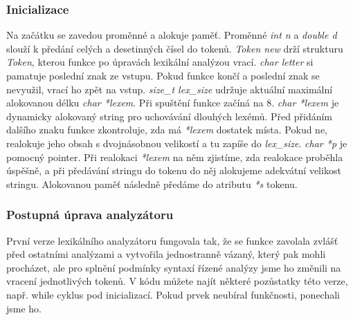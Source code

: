 \documentclass[a4paper, 12pt]{article}
\begin{document}
\subsubsection{Inicializace}
Na začátku se zavedou proměnné a alokuje paměť.\newline
Proměnné \textit{int n} a \textit{double d} slouží k předání celých a desetinných čísel do tokenů. \textit{Token new} drží strukturu \textit{Token}, kterou funkce po úpravách lexikální analýzou vrací. \textit{char letter} si pamatuje poslední znak ze vstupu. Pokud funkce končí a poslední znak se nevyužil, vrací ho zpět na vstup. \textit{size\_t lex\_size} udržuje aktuální maximální alokovanou délku \textit{char *lexem}. Při spuštění funkce začíná na 8. \textit{char *lexem} je dynamicky alokovaný string pro uchovávání dlouhých lexémů. Před přidáním dalšího znaku funkce zkontroluje, zda má \textit{*lexem} dostatek místa. Pokud ne, realokuje jeho obsah s dvojnásobnou velikostí a tu zapíše do \textit{lex\_size}. \textit{char *p} je pomocný pointer. Při realokaci \textit{*lexem} na něm zjistíme, zda realokace proběhla úspěšně, a při předávání stringu do tokenu do něj alokujeme adekvátní velikost stringu. Alokovanou paměť následně předáme do atributu \textit{*s} tokenu.

\subsubsection{Postupná úprava analyzátoru}
První verze lexikálního analyzátoru fungovala tak, že se funkce zavolala zvlášť před ostatními analýzami a vytvořila jednostranně vázaný, který pak mohli procházet, ale pro splnění podmínky syntaxí řízené analýzy jsme ho změnili na vracení jednotlivých tokenů. V kódu můžete najít některé pozůstatky této verze, např. while cyklus pod inicializací. Pokud prvek neubíral funkčnosti, ponechali jsme ho.
\end{document}
